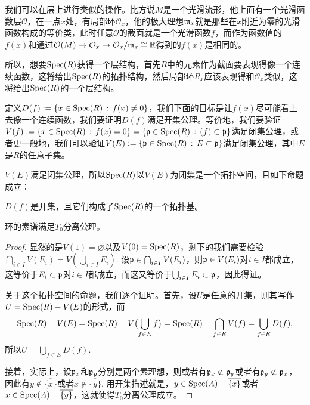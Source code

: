 我们可以在层上进行类似的操作。比方说$M$是一个光滑流形，他上面有一个光滑函数层$\mathcal{O}$，在一点$x$处，有局部环$\mathcal{O}_x$，他的极大理想$\mathfrak{m}_x$就是那些在$x$附近为零的光滑函数构成的等价类，此时任意$\mathcal{O}$的截面就是一个光滑函数$f$，而作为函数值的$f(x)$和通过$\mathcal{O}(M)\to \mathcal{O}_x\to \mathcal{O}_x/\mathfrak{m}_x\cong \mathbb{R}$得到的$f(x)$是相同的。

所以，想要$\operatorname{Spec}(R)$获得一个层结构，首先$R$中的元素作为截面要表现得像一个连续函数，这将给出$\operatorname{Spec}(R)$的拓扑结构，然后局部环$R_x$应该表现得和$\mathcal{O}_x$类似，这将给出$\operatorname{Spec}(R)$的一个层结构。

\begin{para}[素谱的拓扑结构]
定义$D(f):=\{x\in \operatorname{Spec}(R)\,:\, f(x)\neq 0\}$，我们下面的目标是让$f(x)$尽可能看上去像一个连续函数，我们要证明$D(f)$满足开集公理。等价地，我们要验证$V(f):=\{x\in \operatorname{Spec}(R)\,:\, f(x)=0\}=\{\mathfrak{p}\in \operatorname{Spec}(R)\,:\, (f)\subset \mathfrak{p}\}$满足闭集公理，或者更一般地，我们可以验证$V(E):=\{\mathfrak{p}\in \operatorname{Spec}(R)\,:\, E\subset \mathfrak{p}\}$满足闭集公理，其中$E$是$R$的任意子集。
\end{para}

\begin{pro}\label{pro:3.4}
$V(E)$满足闭集公理，所以$\operatorname{Spec}(R)$以$V(E)$为闭集是一个拓扑空间，且如下命题成立：
\begin{compactenum}
\item $D(f)$是开集，且它们构成了$\operatorname{Spec}(R)$的一个拓扑基。
\item 环的素谱满足$T_0$分离公理。
\end{compactenum}
\end{pro}

\begin{proof}
显然的是$V(1)=\varnothing$以及$V(0)=\operatorname{Spec}(R)$，剩下的我们需要检验$\bigcap_{i\in I}V(E_i)=V(\bigcup_{i\in I}E_i)$. 设$\mathfrak{p} \in \bigcap_{i\in I}V(E_i)$，则$\mathfrak{p}\in V(E_i)$对$i\in I$都成立，这等价于$E_i\subset \mathfrak{p}$对$i\in I$都成立，而这又等价于$\bigcup_{i\in I}E_i \subset \mathfrak{p}$，因此得证。

关于这个拓扑空间的命题，我们逐个证明。首先，设$U$是任意的开集，则其写作$U=\operatorname{Spec}(R)-V(E)$的形式，而
\[
\operatorname{Spec}(R)-V(E)=\operatorname{Spec}(R)-V\bigl(\bigcup_{f\in E} f\bigr)=\operatorname{Spec}(R)-\bigcap_{f\in E}V(f)=\bigcup_{f\in E}D(f),
\]
所以$U=\bigcup_{f\in E}D(f)$.

接着，实际上，设$\mathfrak{p}_x$和$\mathfrak{p}_y$分别是两个素理想，则或者有$\mathfrak{p}_x\not\subset \mathfrak{p}_y$或者有$\mathfrak{p}_y\not\subset \mathfrak{p}_x$，因此有$y\not\in \overline{\{x\}}$或者$x\not\in \overline{\{y\}}$. 用开集描述就是，$y\in \operatorname{Spec}(A)-\overline{\{x\}}$或者$x\in \operatorname{Spec}(A)-\overline{\{y\}}$，这就使得$T_0$分离公理成立。
\end{proof}

